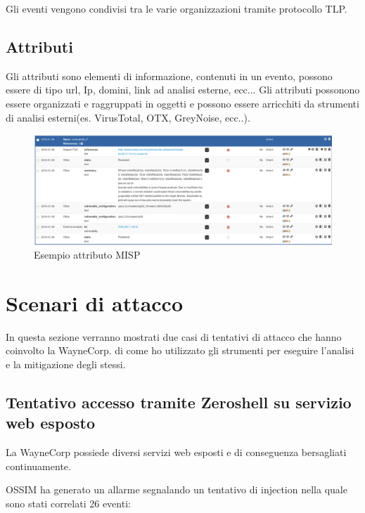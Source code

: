 Gli eventi vengono condivisi tra le varie organizzazioni tramite protocollo TLP.

\newpage

\subsection{Attributi}

Gli attributi sono elementi di informazione, contenuti in un evento, possono essere di tipo url, Ip, domini, link ad analisi esterne, ecc... 
Gli attributi possonono essere organizzati e raggruppati in oggetti e possono essere arricchiti da strumenti di analisi esterni(es. VirusTotal, OTX, GreyNoise, ecc..).

\begin{figure}[h]
    \begin{center}
        \includegraphics[width=0.98\columnwidth]{images/4_caso_d'uso_img/attributeMISP.png}
    \end{center}
    \caption{Esempio attributo MISP}
    \label{fig:Esempio attributo MISP}
\end{figure} 

\section{Scenari di attacco}

In questa sezione verranno mostrati due casi di tentativi di attacco che hanno coinvolto la WayneCorp. di come ho utilizzato gli strumenti per eseguire l'analisi e la mitigazione degli stessi.

\subsection{Tentativo accesso tramite Zeroshell su servizio web esposto}

La WayneCorp possiede diversi servizi web esposti e di conseguenza bersagliati continuamente.\par 
OSSIM ha generato un allarme segnalando un tentativo di injection nella quale sono stati correlati 26 eventi:

